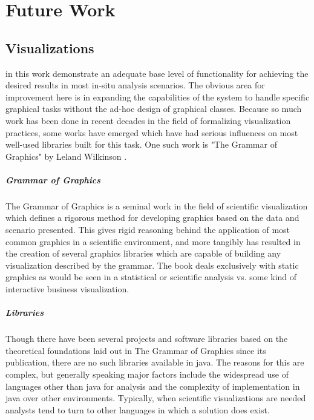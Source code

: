 \chapter{Future Work}
\label{sec:futurework}

\section{Visualizations}
\label{sec:future_viz}
 in this work demonstrate an adequate base level of functionality for achieving the desired results in most in-situ analysis scenarios. The obvious area for improvement here is in expanding the capabilities of the system to handle specific graphical tasks without the ad-hoc design of graphical classes. Because so much work has been done in recent decades in the field of formalizing visualization practices, some works have emerged which have had serious influences on most well-used libraries built for this task. One such work is "The Grammar of Graphics" by Leland Wilkinson \cite{Wilkinson2005}. 

\paragraph{Grammar of Graphics}
The Grammar of Graphics is a seminal work in the field of scientific visualization which defines a rigorous method for developing graphics based on the data and scenario presented.  This gives rigid reasoning behind the application of most common graphics in a scientific environment, and more tangibly has resulted in the creation of several graphics libraries which are capable of building any visualization described by the grammar. The book deals exclusively with static graphics as would be seen in a statistical or scientific analysis vs. some kind of interactive business visualization.

\paragraph{Libraries}
Though there have been several projects and software libraries based on the theoretical foundations laid out in The Grammar of Graphics since its publication, there are no such libraries available in java. The reasons for this are complex, but generally speaking major factors include the widespread use of languages other than java for analysis and the complexity of implementation in java over other environments. Typically, when scientific visualizations are needed analysts tend to turn to other languages in which a solution does exist.

